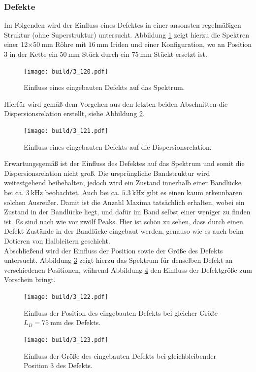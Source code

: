 \subsubsection{Defekte}
Im Folgenden wird der Einfluss eines Defektes in einer ansonsten regelmäßigen Struktur (ohne Superstruktur) untersucht. Abbildung \ref{fig:3_120} zeigt hierzu die Spektren einer 12$\times\SI{50}{\milli\meter}$ Röhre mit $\SI{16}{\milli\meter}$ Iriden und einer Konfiguration, wo an Position 3 in der Kette ein $\SI{50}{\milli\meter}$ Stück durch ein $\SI{75}{\milli\meter}$ Stückt ersetzt ist.
\begin{figure}
  \centering  \texttt{[image: build/3\_120.pdf]}  \caption{Einfluss eines eingebauten Defekts auf das Spektrum.} \label{fig:3_120}
\end{figure}
Hierfür wird gemäß dem Vorgehen aus den letzten beiden Abschnitten die Dispersionsrelation erstellt, siehe Abbildung \ref{fig:3_121}.
\begin{figure}
  \centering  \texttt{[image: build/3\_121.pdf]}  \caption{Einfluss eines eingebauten Defekts auf die Dispersionsrelation.} \label{fig:3_121}
\end{figure}
Erwartungsgemäß ist der Einfluss des Defektes auf das Spektrum und somit die Dispersionsrelation nicht groß. Die ursprüngliche Bandstruktur wird weitestgehend beibehalten, jedoch wird ein Zustand innerhalb einer Bandlücke bei ca. $\SI{3}{\kilo\hertz}$ beobachtet. Auch bei ca. $\SI{5.3}{\kilo\hertz}$ gibt es einen kaum erkennbaren solchen Ausreißer. Damit ist die Anzahl Maxima tatsächlich erhalten, wobei ein Zustand in der Bandlücke liegt, und dafür im Band selbst einer weniger zu finden ist. Es sind nach wie vor zwölf Peaks. Hier ist schön zu sehen, dass durch einen Defekt Zustände in der Bandlücke eingebaut werden, genauso wie es auch beim Dotieren von Halbleitern geschieht.\\
Abschließend wird der Einfluss der Position sowie der Größe des Defekts untersucht. Abbildung \ref{fig:3_122} zeigt hierzu das Spektrum für denselben Defekt an verschiedenen Positionen, während Abbildung \ref{fig:3_123} den Einfluss der Defektgröße zum Vorschein bringt.
\begin{figure}
  \centering  \texttt{[image: build/3\_122.pdf]}  \caption{Einfluss der Position des eingebauten Defekts bei gleicher Größe $L_D=\SI{75}{\milli\meter}$ des Defekts.} \label{fig:3_122}
\end{figure}
\begin{figure}
  \centering  \texttt{[image: build/3\_123.pdf]}  \caption{Einfluss der Größe des eingebauten Defekts bei gleichbleibender Position 3 des Defekts.} \label{fig:3_123}
\end{figure}
